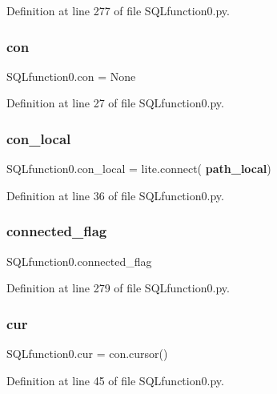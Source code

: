 Definition at line 277 of file S\+Q\+Lfunction0.\+py.

\mbox{\label{namespace_s_q_lfunction0_a14332a941a7353253f1de3cfd50c2cc3}} 
\subsubsection{con}
{\footnotesize\ttfamily S\+Q\+Lfunction0.\+con = None}



Definition at line 27 of file S\+Q\+Lfunction0.\+py.

\mbox{\label{namespace_s_q_lfunction0_a138caa3c8169863d65c5d77272619c95}} 
\subsubsection{con\+\_\+local}
{\footnotesize\ttfamily S\+Q\+Lfunction0.\+con\+\_\+local = lite.\+connect(\textbf{ path\+\_\+local})}



Definition at line 36 of file S\+Q\+Lfunction0.\+py.

\mbox{\label{namespace_s_q_lfunction0_a2563e47416089d82120dd800e6c75140}} 
\subsubsection{connected\+\_\+flag}
{\footnotesize\ttfamily S\+Q\+Lfunction0.\+connected\+\_\+flag}



Definition at line 279 of file S\+Q\+Lfunction0.\+py.

\mbox{\label{namespace_s_q_lfunction0_afb4f2538bb92f4f1c2a89d6ec1479431}} 
\subsubsection{cur}
{\footnotesize\ttfamily S\+Q\+Lfunction0.\+cur = con.\+cursor()}



Definition at line 45 of file S\+Q\+Lfunction0.\+py.

